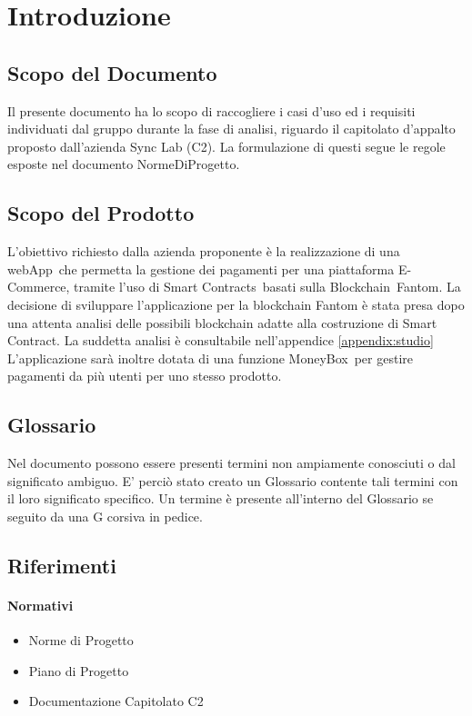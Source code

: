 \section{Introduzione}

\subsection{Scopo del Documento}
Il presente documento ha lo scopo di raccogliere i casi d'uso ed i requisiti individuati dal gruppo
durante la fase di analisi, riguardo il capitolato d'appalto proposto dall'azienda Sync Lab (C2). La formulazione di questi segue le regole esposte nel documento
NormeDiProgetto.

\subsection{Scopo del Prodotto}
L'obiettivo richiesto dalla azienda proponente è la realizzazione di una webApp\glo\ che permetta la gestione dei pagamenti per una piattaforma E-Commerce, tramite l'uso di Smart Contracts\glo\ basati sulla Blockchain\glo\ Fantom\glo.
La decisione di sviluppare l'applicazione per la blockchain Fantom è stata presa dopo una attenta analisi delle possibili blockchain adatte alla costruzione di Smart Contract. La suddetta analisi è consultabile nell'appendice \ref{appendix:studio}
L'applicazione sarà inoltre dotata di una funzione MoneyBox\glo\ per gestire pagamenti da più utenti per uno stesso prodotto.

\subsection{Glossario}
Nel documento possono essere presenti termini non ampiamente conosciuti o dal significato ambiguo. E' perciò stato creato
un Glossario contente tali termini con il loro significato specifico. Un termine è presente
all’interno del Glossario se seguito da una G corsiva in pedice.

\subsection{Riferimenti}

\paragraph{Normativi}
\begin{itemize}
    \item Norme di Progetto
    \item Piano di Progetto
    \item Documentazione Capitolato C2
\end{itemize}

